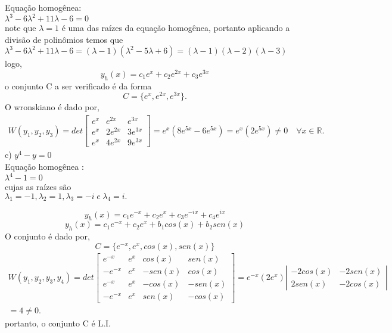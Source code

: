 \documentclass[a4paper,12pt]{article}
\begin{document}
Equa\c c\~ao homog\^enea: \\
${\lambda}^{3} -6{\lambda}^{2} + 11{\lambda} - 6 = 0$\\
note que $\lambda = 1$ \'e uma das ra\'izes da equa\c c\~ao homog\^enea, portanto aplicando a divis\~ao de polin\^omios
temos que \\
${\lambda}^{3} -6{\lambda}^{2} + 11{\lambda} - 6 = (\lambda - 1)({\lambda}^{2} -5{\lambda} + 6) =  (\lambda - 1)(\lambda - 2)(\lambda - 3)$
\\ logo,\\
$$y_h(x) = c_1e^{x} + c_2e^{2x} + c_3e^{3x}$$
o conjunto C a ser verificado \'e da forma
$$C = \{e^{x}, e^{2x}, e^{3x}\}.$$
O wronskiano \'e dado por,
\begin{align*}
	W(y_1,y_2, y_3) = det \left [ \begin{array}{ccc} 
			e^{x} & e^{2x}  & e^{3x}\\
			e^{x} & 2e^{2x} & 3e^{3x}\\
			e^{x} & 4e^{2x} & 9e^{3x}
	\end{array} \right ] = e^{x}(8e^{5x} - 6e^{5x})= e^{x}(2e^{5x}) \neq 0 \quad \forall x \in \mathbb{R}.
\end{align*}
c) $y^{4} - y = 0$ \\
Equa\c c\~ao homog\^enea :\\
${\lambda}^{4} - 1 = 0$\\
cujas as ra\'izes s\~ao\\
${\lambda}_1 = -1,  {\lambda}_2 = 1, {\lambda}_3 = -i \hspace{3pt} e\hspace{3pt} {\lambda}_4 = i.$

$$y_h(x) = c_1e^{-x} + c_2e^{x} + c_3e^{-ix} + c_4e^{ix}$$
$$y_h(x) = c_1e^{-x} + c_2e^{x} + b_1cos(x) + b_2sen(x)$$
O conjunto \'e dado por,
$$C = \{e^{-x},e^{x}, cos(x),sen(x)\}$$
\begin{align*}
	W(y_1,y_2, y_3, y_4) = det \left [ \begin{array}{cccc} 
			e^{-x}  & e^{x} & cos(x)  &  sen(x)\\
		   -e^{-x}  & e^{x} & -sen(x) &  cos(x)\\
			e^{-x}  & e^{x} & -cos(x) & -sen(x)\\
		   -e^{-x}  & e^{x} & sen(x)  & -cos(x)
	\end{array} \right ] = e^{-x}(2e^{x})\left | 
		\begin{array}{cc}	
			-2cos(x) & -2sen(x) \\
			2sen(x) & -2cos(x)
		\end{array}
	\right |
	\\= 4 \neq 0.
\end{align*}
portanto, o conjunto C \'e L.I.\\
\end{document}
